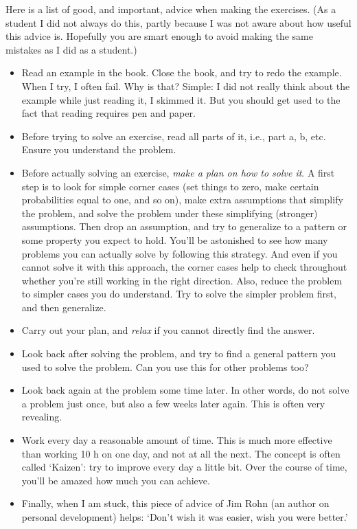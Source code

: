 Here is a list of good, and important, advice when making the exercises.
(As a student I did not always do this, partly because I was not aware about how useful this advice is. Hopefully you are smart enough to avoid making the same mistakes as I did as a student.)
\begin{itemize}
\item  Read an example in the book. Close the book, and try to redo the example. When I try, I often fail. Why is that? Simple: I did not really   think about the example while just reading it, I skimmed it.  But you should get used to the fact that reading requires pen and paper.
\item  Before trying to solve an exercise, read all parts of it, i.e., part a, b, etc. Ensure you understand the problem.
\item Before actually solving  an exercise, \emph{make a plan on how to solve it}. A first step is to look for simple corner cases (set things to zero, make certain probabilities equal to one, and so on), make extra assumptions that simplify the problem, and solve the problem under these simplifying (stronger) assumptions. Then drop an assumption, and try to generalize to a pattern or some property you expect to hold. You'll be astonished to see how many problems you can actually solve by following this strategy. And even if you cannot solve it with this approach, the corner cases help to check throughout whether you're still working in the right direction. Also, reduce the problem to simpler cases you do understand. Try to solve the simpler problem first, and then generalize.
\item Carry out your plan, and \emph{relax} if  you cannot directly find the answer.
\item Look back after solving the problem, and try to find a general pattern you used to solve the problem. Can you use this for other problems too?
\item Look back again at the problem some time later. In other words, do not solve  a problem just once, but also a few weeks later again. This is often very revealing.
\item Work every day a reasonable amount of time. This is much more effective than working 10 h on one day, and not at all the next. The concept is often called `Kaizen': try to improve every day a little bit. Over the course of time, you'll be amazed how much you can achieve.
\item Finally, when I am stuck, this piece of advice of Jim Rohn (an author on personal development) helps: `Don't wish it was easier, wish you were better.'
\end{itemize}
